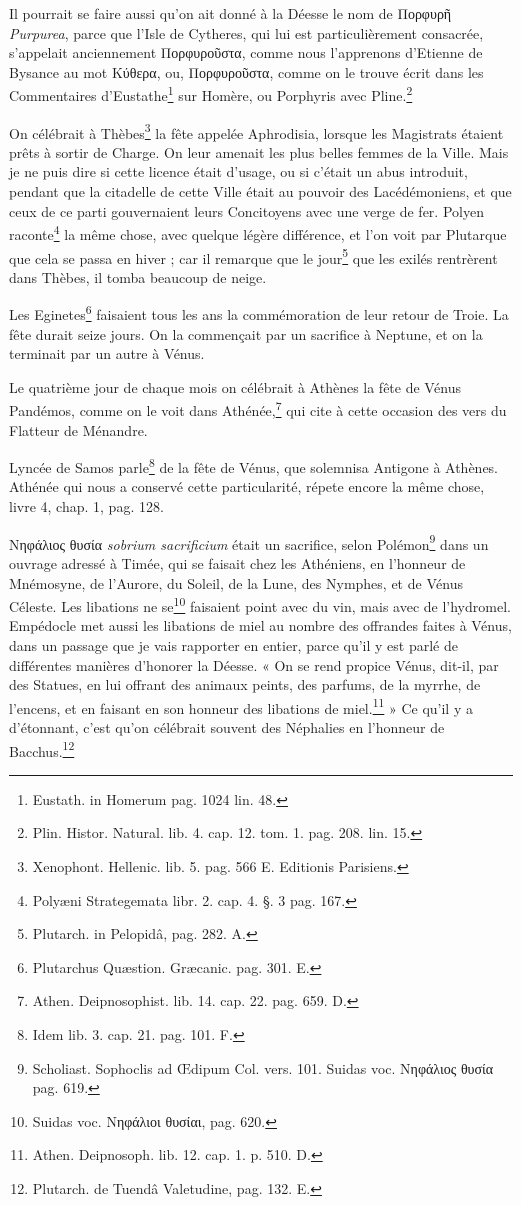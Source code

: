 \documentclass[a4paper, 18pt, oneside]{article}
\begin{document}
Il pourrait se faire aussi qu'on ait donné à la Déesse le nom de Πορφυρῆ \emph{Purpurea}, parce que l'Isle de Cytheres, qui lui est particulièrement consacrée, s'appelait anciennement Πορφυροῦστα, comme nous l'apprenons d'Etienne de Bysance au mot Κύθερα, ou, Πορφυροῦστα, comme on le trouve écrit dans les Commentaires d'Eustathe\footnote{Eustath. in Homerum pag. 1024 lin. 48.} sur Homère, ou Porphyris avec Pline.\footnote{Plin. Histor. Natural. lib. 4. cap. 12. tom. 1. pag. 208. lin. 15.}

On célébrait à Thèbes\footnote{Xenophont. Hellenic. lib. 5. pag. 566 E. Editionis Parisiens.} la fête appelée Aphrodisia, lorsque les Magistrats étaient prêts à sortir de Charge. On leur amenait les plus belles femmes de la Ville. Mais je ne puis dire si cette licence était d'usage, ou si c'était un abus introduit, pendant que la citadelle de cette Ville était au pouvoir des Lacédémoniens, et que ceux de ce parti gouvernaient leurs Concitoyens avec une verge de fer. Polyen raconte\footnote{Polyæni Strategemata libr. 2. cap. 4. §. 3 pag. 167.} la même chose, avec quelque légère différence, et l'on voit par Plutarque que cela se passa en hiver ; car il remarque que le jour\footnote{Plutarch. in Pelopidâ, pag. 282. A.} que les exilés rentrèrent dans Thèbes, il tomba beaucoup de neige.

Les Eginetes\footnote{Plutarchus Quæstion. Græcanic. pag. 301. E.} faisaient tous les ans la commémoration de leur retour de Troie. La fête durait seize jours. On la commençait par un sacrifice à Neptune, et on la terminait par un autre à Vénus.

Le quatrième jour de chaque mois on célébrait à Athènes la fête de Vénus Pandémos, comme on le voit dans Athénée,\footnote{Athen. Deipnosophist. lib. 14. cap. 22. pag. 659. D.} qui cite à cette occasion des vers du Flatteur de Ménandre.

Lyncée de Samos parle\footnote{Idem lib. 3. cap. 21. pag. 101. F.} de la fête de Vénus, que solemnisa Antigone à Athènes. Athénée qui nous a conservé cette particularité, répete encore la même chose, livre 4, chap. 1, pag. 128.

Νηφάλιος θυσία \emph{sobrium sacrificium} était un sacrifice, selon Polémon\footnote{Scholiast. Sophoclis ad Œdipum Col. vers. 101. Suidas voc. Νηφάλιος θυσία pag. 619.} dans un ouvrage adressé à Timée, qui se faisait chez les Athéniens, en l'honneur de Mnémosyne, de l'Aurore, du Soleil, de la Lune, des Nymphes, et de Vénus Céleste. Les libations ne se\footnote{Suidas voc. Νηφάλιοι θυσίαι, pag. 620.} faisaient point avec du vin, mais avec de l'hydromel. Empédocle met aussi les libations de miel au nombre des offrandes faites à Vénus, dans un passage que je vais rapporter en entier, parce qu'il y est parlé de différentes manières d'honorer la Déesse. « On se rend propice Vénus, dit-il, par des Statues, en lui offrant des animaux peints, des parfums, de la myrrhe, de l'encens, et en faisant en son honneur des libations de miel.\footnote{Athen. Deipnosoph. lib. 12. cap. 1. p. 510. D.} » Ce qu'il y a d'étonnant, c'est qu'on célébrait souvent des Néphalies en l'honneur de Bacchus.\footnote{Plutarch. de Tuendâ Valetudine, pag. 132. E.}
\end{document}
